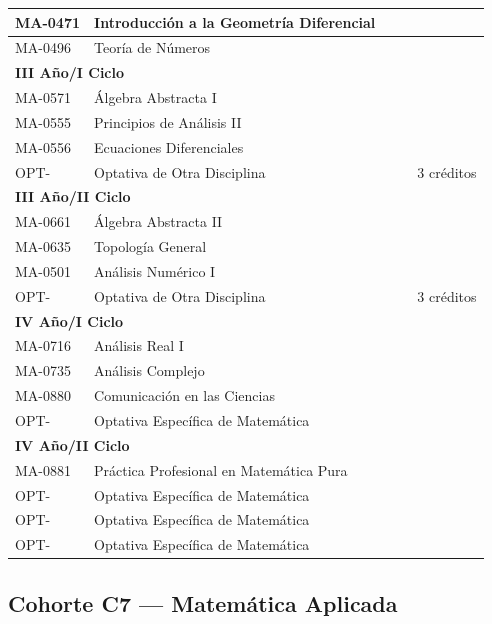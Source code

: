 \begin{longtable}{|p{2cm}|p{7cm}|p{1.6cm}|p{1.6cm}|p{2.8cm}|}
MA-0471 & Introducción a la Geometría Diferencial &  &  &  \\ \hline
MA-0496 & Teoría de Números &  &  &  \\ \hline
\multicolumn{5}{|l|}{\cellcolor[HTML]{E6E6E6}\textbf{III Año/I Ciclo}} \\ \hline
MA-0571 & Álgebra Abstracta I &  &  &  \\ \hline
MA-0555 & Principios de Análisis II &  &  &  \\ \hline
MA-0556 & Ecuaciones Diferenciales &  &  &  \\ \hline
OPT- & Optativa de Otra Disciplina &  &  & 3 créditos \\ \hline
\multicolumn{5}{|l|}{\cellcolor[HTML]{E6E6E6}\textbf{III Año/II Ciclo}} \\ \hline
MA-0661 & Álgebra Abstracta II &  &  &  \\ \hline
MA-0635 & Topología General &  &  &  \\ \hline
MA-0501 & Análisis Numérico I &  &  &  \\ \hline
OPT- & Optativa de Otra Disciplina &  &  & 3 créditos \\ \hline
\multicolumn{5}{|l|}{\cellcolor[HTML]{E6E6E6}\textbf{IV Año/I Ciclo}} \\ \hline
MA-0716 & Análisis Real I &  &  &  \\ \hline
MA-0735 & Análisis Complejo &  &  &  \\ \hline
MA-0880 & Comunicación en las Ciencias &  &  &  \\ \hline
OPT- & Optativa Específica de Matemática &  &  &  \\ \hline
\multicolumn{5}{|l|}{\cellcolor[HTML]{E6E6E6}\textbf{IV Año/II Ciclo}} \\ \hline
MA-0881 & Práctica Profesional en Matemática Pura &  &  &  \\ \hline
OPT- & Optativa Específica de Matemática &  &  &  \\ \hline
OPT- & Optativa Específica de Matemática &  &  &  \\ \hline
OPT- & Optativa Específica de Matemática &  &  &  \\ \hline
\end{longtable}

\subsection{Cohorte C7 --- Matemática Aplicada}
\label{anexo:estudioC7A}

